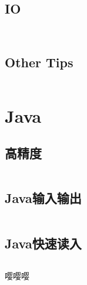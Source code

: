 \documentclass[a4paper,13.6pt]{article}
\begin{document}
\begin{CJK}{UTF8}{gbsn}
\subsection{IO}
\inputminted{c++}{../ACM_Template/Operation/IOgetchar.cpp}

\inputminted{c++}{../ACM_Template/Operation/Short_IO.cpp}

\subsection{Other Tips}
\inputminted{c++}{../ACM_Template/Operation/tips.cpp}

\newpage
\section{Java}
\subsection{高精度}
\inputminted{java}{../ACM_Template/Java/BigDecimal.java}
\subsection{Java输入输出}
\inputminted{java}{../ACM_Template/Java/Java_input_output.java}
\subsection{Java快速读入}
\inputminted{java}{../ACM_Template/Java/javafastin.java}


\newpage
嘤嘤嘤
\end{CJK}
\end{document}
